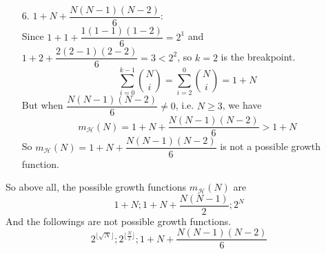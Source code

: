\begin{itemize}
    \item[6.] $1+N+\dfrac{N(N-1)(N-2)}{6}$:\\
    Since $1+1+\dfrac{1(1-1)(1-2)}{6}=2^1$ and $1+2+\dfrac{2(2-1)(2-2)}{6}=3<2^2$, so $k=2$ is the breakpoint.
    $$\sum_{i=0}^{k-1} \binom{N}{i} = \sum_{i=2}^{0} \binom{N}{i} = 1+N$$
    But when $\dfrac{N(N-1)(N-2)}{6}\neq 0$, i.e. $N\geq 3$, we have
    $$m_{\mathcal{H}}(N)=1+N+\dfrac{N(N-1)(N-2)}{6}>1+N$$
    So $m_{\mathcal{H}}(N)=1+N+\dfrac{N(N-1)(N-2)}{6}$ is not a possible growth function.
    
\end{itemize}
So above all, the possible growth functions $m_{\mathcal{H}}(N)$ are 
$$1+N ; 1+N+\dfrac{N(N-1)}{2}; 2^N $$
And the followings are not possible growth functions.
$$ 2^{\lfloor\sqrt{N}\rfloor} ; 2^{\lfloor \frac{N}{2} \rfloor}; 1+N+\dfrac{N(N-1)(N-2)}{6} $$

\newpage